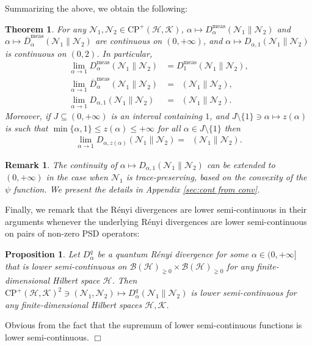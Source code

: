 \documentclass[unsortedaddress,superscriptaddress,pra,notitlepage]{revtex4}
\newtheorem{theorem}[definition]{Theorem}
\newtheorem{prop}[definition]{Proposition}
\newtheorem{rem}[definition]{Remark}
\newenvironment{proof}[1][Proof]{\begin{trivlist}
\item[\hskip \labelsep {\bfseries #1}]}{\hfill$\Box$\end{trivlist}}
\def\B{{\mathcal B}}
\def\N{\mathcal{N}}
\def\hil{{\mathcal H}}
\def\kil{{\mathcal K}}
\def\oll{\overline}
\def\CP{\mathrm{CP}}
\def\meas{\mathrm{meas}}
\def\pne{_{\gneq 0}}
\def\cpso{\text{CPSO} }
\DeclareMathOperator{\DU}{\mathit{D}^{Um}}
\begin{document}
Summarizing the above, 
we obtain the following:
\begin{theorem}
For any $\N_1,\N_2\in\CP^+(\hil,\kil)$, 
$\alpha\mapsto D_{\alpha}^{\meas}(\N_1\|\N_2)$ and
$\alpha\mapsto \oll{D}_{\alpha}^{\meas}(\N_1\|\N_2)$ are
continuous on $(0,+\infty)$, and 
$\alpha\mapsto D_{\alpha,1}(\N_1\|\N_2)$ is continuous on $(0,2)$. 
In particular,
\begin{align}
\lim_{\alpha\to 1}D_{\alpha}^{\meas}(\N_1\|\N_2)
&=
D_1^{\meas}(\N_1\|\N_2),\label{ch limit at 1-1}\\
\lim_{\alpha\to 1}\oll{D}_{\alpha}^{\meas}(\N_1\|\N_2)
&=\DU(\N_1\|\N_2),\label{ch limit at 1-2}\\
\lim_{\alpha\to 1}D_{\alpha,1}(\N_1\|\N_2)
&=\DU(\N_1\|\N_2).\label{ch limit at 1-3}
\end{align}
Moreover, if $J\subseteq(0,+\infty)$ is an interval containing $1$, and 
$J\setminus\{1\}\ni\alpha\mapsto z(\alpha)$ is such that 
$\min\{\alpha,1\}\le z(\alpha)\le +\infty$ for all $\alpha\in J\setminus\{1\}$ then 
\begin{align}\label{channel div limit z(alpha)}
\lim_{\alpha\to 1}D_{\alpha,z(\alpha)}(\N_1\|\N_2)=
\DU(\N_1\|\N_2).
\end{align}
\end{theorem}

\begin{rem}
The continuity of $\alpha\mapsto D_{\alpha,1}(\N_1\|\N_2)$ can be 
extended to $(0,+\infty)$ in the case when $\N_1$ is trace-preserving, based on 
the convexity of the $\psi$ function. We present the details in Appendix \ref{sec:cont from conv}.
\end{rem}

Finally, we remark that the \cpso R\'enyi divergences are lower semi-continuous in their arguments whenever the underlying R\'enyi divergences are lower semi-continuous on pairs of non-zero PSD operators:

\begin{prop}\label{prop:channel div lsc}
Let $D_{\alpha}^q$ be a quantum R\'enyi divergence for some $\alpha\in(0,+\infty]$ that is 
lower semi-continuous on $\B(\hil)\pne\times\B(\hil)\pne$ for any finite-dimensional Hilbert space $\hil$. Then $\CP^+(\hil,\kil)^2\ni(\N_1,\N_2)\mapsto D_{\alpha}^q(\N_1\|\N_2)$ is 
lower semi-continuous for any finite-dimensional Hilbert spaces $\hil,\kil$.
\end{prop}
\begin{proof}
Obvious from the fact that the supremum of lower semi-continuous functions is lower semi-continuous. 
\end{proof}
\end{document}
